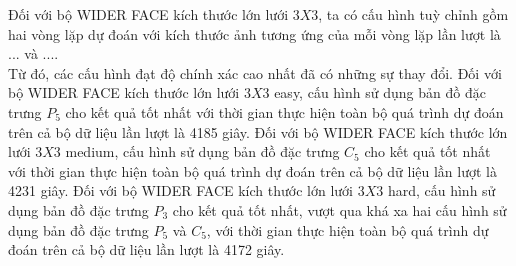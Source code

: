 {    \noindent
    Đối với bộ WIDER FACE kích thước lớn lưới $3 X 3$, ta có cấu hình tuỳ chỉnh gồm hai vòng lặp dự đoán với kích thước ảnh tương ứng của mỗi vòng lặp lần lượt là ... và .... \\
    Từ đó, các cấu hình đạt độ chính xác cao nhất đã có những sự thay đổi.
    Đối với bộ WIDER FACE kích thước lớn lưới $3 X 3$ easy, cấu hình sử dụng bản đồ đặc trưng ${P}_{5}$ cho kết quả tốt nhất với thời gian thực hiện toàn bộ quá trình dự đoán trên cả bộ dữ liệu lần lượt là 4185 giây.
    Đối với bộ WIDER FACE kích thước lớn lưới $3 X 3$ medium, cấu hình sử dụng bản đồ đặc trưng ${C}_{5}$ cho kết quả tốt nhất với thời gian thực hiện toàn bộ quá trình dự đoán trên cả bộ dữ liệu lần lượt là 4231 giây.
    Đối với bộ WIDER FACE kích thước lớn lưới $3 X 3$ hard, cấu hình sử dụng bản đồ đặc trưng ${P}_{3}$ cho kết quả tốt nhất, vượt qua khá xa hai cấu hình sử dụng bản đồ đặc trưng ${P}_{5}$ và ${C}_{5}$, với thời gian thực hiện toàn bộ quá trình dự đoán trên cả bộ dữ liệu lần lượt là 4172 giây.

}
